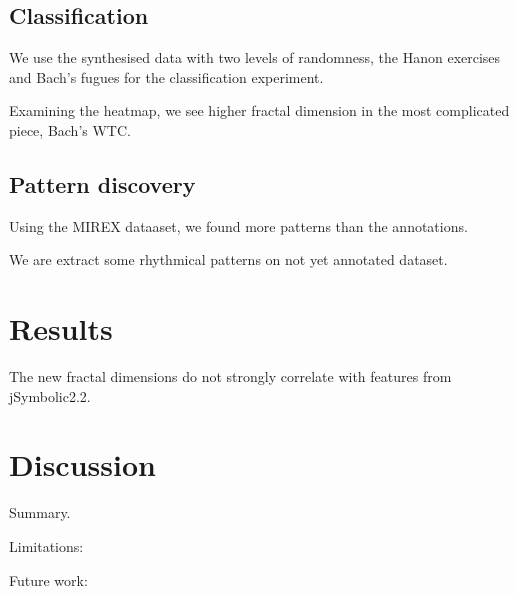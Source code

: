 \documentclass[acmsmall,10pt]{acmart}%
\begin{document}
\subsection{Classification}
We use the synthesised data with two levels of randomness, the Hanon exercises
and Bach's fugues for the classification experiment.

Examining the heatmap, we see higher fractal dimension in the most complicated
piece, Bach's WTC. 

\subsection{Pattern discovery}
Using the MIREX dataaset, we found more patterns than the annotations.

We are extract some rhythmical patterns on not yet annotated dataset.

\section{Results}
The new fractal dimensions do not strongly correlate with features from
jSymbolic2.2. 

\section{Discussion}

Summary. 

Limitations:  

Future work:
%






\end{document}
